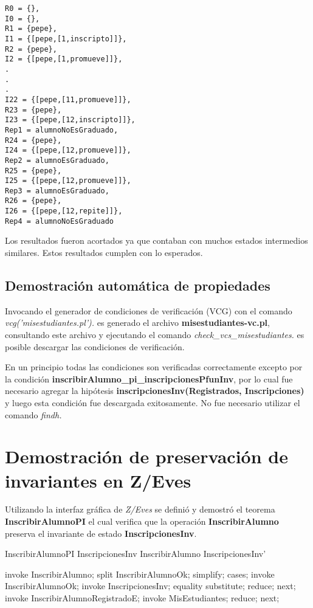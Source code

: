\documentclass{article}
\begin{document}
\begin{verbatim}
R0 = {},  
I0 = {},  
R1 = {pepe},  
I1 = {[pepe,[1,inscripto]]},  
R2 = {pepe},  
I2 = {[pepe,[1,promueve]]},  
.
.
.
I22 = {[pepe,[11,promueve]]},  
R23 = {pepe},  
I23 = {[pepe,[12,inscripto]]},  
Rep1 = alumnoNoEsGraduado,  
R24 = {pepe},  
I24 = {[pepe,[12,promueve]]},  
Rep2 = alumnoEsGraduado,  
R25 = {pepe},  
I25 = {[pepe,[12,promueve]]},  
Rep3 = alumnoEsGraduado,  
R26 = {pepe},  
I26 = {[pepe,[12,repite]]},  
Rep4 = alumnoNoEsGraduado
\end{verbatim}

Los resultados fueron acortados ya que contaban con muchos estados intermedios similares. Estos resultados cumplen con lo esperados.

\subsection*{Demostración automática de propiedades}
Invocando el generador de condiciones de verificación (VCG) con el comando \emph{vcg('misestudiantes.pl').} es generado el archivo \textbf{misestudiantes-vc.pl}, consultando este archivo y ejecutando el comando \emph{check\_vcs\_misestudiantes.} es posible descargar las condiciones de verificación.

En un principio todas las condiciones son verificadas correctamente excepto por la condición \textbf{inscribirAlumno\_pi\_inscripcionesPfunInv}, por lo cual fue necesario agregar la hipótesis \textbf{inscripcionesInv(Registrados, Inscripciones)} y luego esta condición fue descargada exitosamente. No fue necesario utilizar el comando \emph{findh.}

\section{Demostración de preservación de invariantes en Z/Eves}
Utilizando la interfaz gráfica de \emph{Z/Eves} se definió y demostró el teorema \textbf{InscribirAlumnoPI} el cual verifica que la operación \textbf{InscribirAlumno} preserva el invariante de estado \textbf{InscripcionesInv}.
\begin{theorem}{InscribirAlumnoPI}
  InscripcionesInv \land InscribirAlumno \implies InscripcionesInv'
\end{theorem}

\begin{zproof}[InscribirAlumnoPI]
  invoke InscribirAlumno;
  split InscribirAlumnoOk;
  simplify;
  cases;
  invoke InscribirAlumnoOk;
  invoke InscripcionesInv;
  equality substitute;
  reduce;
  next;
  invoke InscribirAlumnoRegistradoE;
  invoke \Xi MisEstudiantes;
  reduce;
  next;
\end{zproof}
\end{document}
